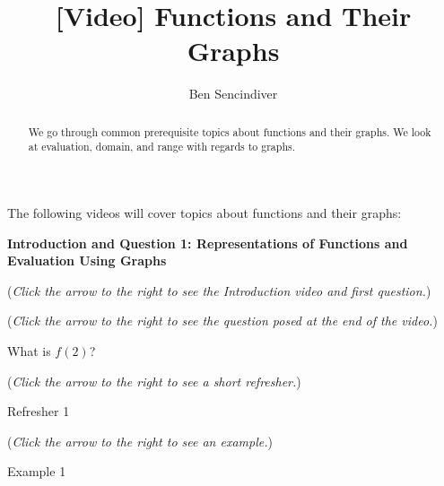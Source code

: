 \documentclass{ximera}
\title[Prerequisite Videos: ]{[Video] Functions and Their Graphs}
\author{Ben Sencindiver}
\begin{document}
\begin{abstract}
  We go through common prerequisite topics about functions and their graphs. 
  We look at evaluation, domain, and range with regards to graphs.
\end{abstract}
\maketitle

The following videos will cover topics about functions and their graphs:

\textbf{Introduction and Question 1: Representations of Functions and Evaluation Using Graphs}
\begin{question}
\begin{flushright}
{\color{blue}(\emph{Click the arrow to the right to see the Introduction video and first question.})}
\end{flushright}
\begin{center}
\begin{expandable}
{\color{blue}(\emph{Click the arrow to the right to see the  question
posed at the end of the video.})}
\begin{expandable}
What is $f(2)$?
\begin{multipleChoice}
\end{multipleChoice}
\begin{flushright}
{\color{blue}(\emph{Click the arrow to the right to see a short refresher.})}
\end{flushright}
\begin{expandable}
Refresher 1
\end{expandable}
\begin{flushright}
{\color{blue}(\emph{Click the arrow to the right to see an example.})}
\end{flushright}
\begin{expandable}
Example 1
\end{expandable}
\end{expandable}
\end{expandable}
\end{center}
\end{question}
\end{document}

